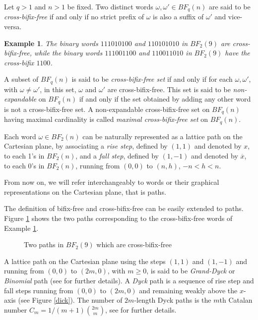 \documentclass[a4paper,11pt]{article}
\newtheorem{example}{Example}[section]
\begin{document}
Let $q>1$ and $n>1$ be fixed. Two distinct words $\omega,\omega'
\in BF_q(n)$ are said to be \emph{cross-bifix-free} if and only if
no strict prefix of $\omega$ is also a suffix of $\omega'$ and
vice-versa.

\begin{example}\label{esemp}
The binary words $111010100$ and $110101010$ in $BF_2(9)$ are
cross-bifix-free, while the binary words $111001100$ and
$110011010$ in $BF_2(9)$ have the cross-bifix $1100$.
\end{example}

A subset of $BF_q(n)$ is said to be \emph{cross-bifix-free set} if
and only if for each $\omega, \omega'$, with $\omega \neq
\omega'$, in this set, $\omega$ and $\omega'$ are
cross-bifix-free. This set is said to be \emph{non-expandable} on
$BF_q(n)$ if and only if the set obtained by adding any other word
is not a cross-bifix-free set. A non-expandable cross-bifix-free
set on $BF_q(n)$ having maximal cardinality is called
\emph{maximal cross-bifix-free set} on $BF_q(n)$.

Each word $\omega \in BF_2(n)$ can be naturally represented as a
lattice path on the Cartesian plane, by associating a \emph{rise
step}, defined by $(1,1)$ and denoted by $x$, to each 1's in
$BF_2(n)$, and a \emph{fall step}, defined by $(1,-1)$ and denoted
by $\overline{x}$, to each 0's in $BF_2(n)$, running from $(0,0)$
to $(n,h)$, $-n<h<n$.

From now on, we will refer interchangeably to words or their
graphical representations on the Cartesian plane, that is paths.

The definition of bifix-free and cross-bifix-free can be easily
extended to paths. Figure \ref{exmpcrossbf} shows the two paths
corresponding to the cross-bifix-free words of Example
\ref{esemp}.

\begin{figure}[!htb]
\begin{center}
 \caption{\small{Two
paths in $BF_2(9)$ which are cross-bifix-free}
\label{exmpcrossbf}}\vspace{-15pt}
\end{center}
\end{figure}

A lattice path on the Cartesian plane using the steps $(1,1)$ and
$(1,-1)$ and running from $(0,0)$ to $(2m,0)$, with $m \geq 0$, is
said to be \emph{Grand-Dyck} or \emph{Binomial} path (see \cite{5}
for further details). A \emph{Dyck} path is a sequence of rise
step and fall steps running from $(0,0)$ to $(2m,0)$ and remaining
weakly above the $x$-axis (see Figure \ref{dick}). The number of
$2m$-length Dyck paths is the $m$th Catalan number $C_m=1/(m+1){2m
\choose m}$, see \cite{13} for further details.
\end{document}
